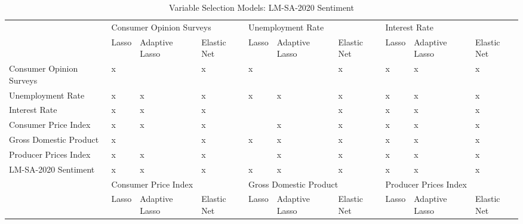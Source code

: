 \begin{landscape}
\begin{table}[]
\caption{Variable Selection Models: LM-SA-2020 Sentiment}
\label{tab:selectionlm}
\begin{adjustbox}{max width=\linewidth}
\begin{tabular}{llllllllll}
\hline
                         & \multicolumn{3}{l}{Consumer Opinion Surveys} & \multicolumn{3}{l}{Unemployment Rate}      & \multicolumn{3}{l}{Interest Rate}         \\
                         & Lasso    & Adaptive Lasso    & Elastic Net   & Lasso    & Adaptive Lasso   & Elastic Net  & Lasso   & Adaptive Lasso   & Elastic Net  \\
Consumer Opinion Surveys & x        &                   & x             & x        &                  & x            & x       & x                & x            \\
Unemployment Rate        & x        & x                 & x             & x        & x                & x            & x       & x                & x            \\
Interest Rate            & x        & x                 & x             &          &                  & x            & x       & x                & x            \\
Consumer Price Index     & x        & x                 & x             &          & x                & x            & x       & x                & x            \\
Gross Domestic Product   & x        &                   & x             & x        & x                & x            & x       & x                & x            \\
Producer Prices Index    & x        & x                 & x             &          & x                & x            & x       & x                & x            \\ \hline
LM-SA-2020 Sentiment          & x        & x                 & x             & x        & x                & x            & x       & x                & x            \\ \hline
                         & \multicolumn{3}{l}{Consumer Price Index}     & \multicolumn{3}{l}{Gross Domestic Product} & \multicolumn{3}{l}{Producer Prices Index} \\
                         & Lasso    & Adaptive Lasso    & Elastic Net   & Lasso    & Adaptive Lasso   & Elastic Net  & Lasso   & Adaptive Lasso   & Elastic Net  \\

\end{tabular}
\end{adjustbox}
\end{table}
\end{landscape}
